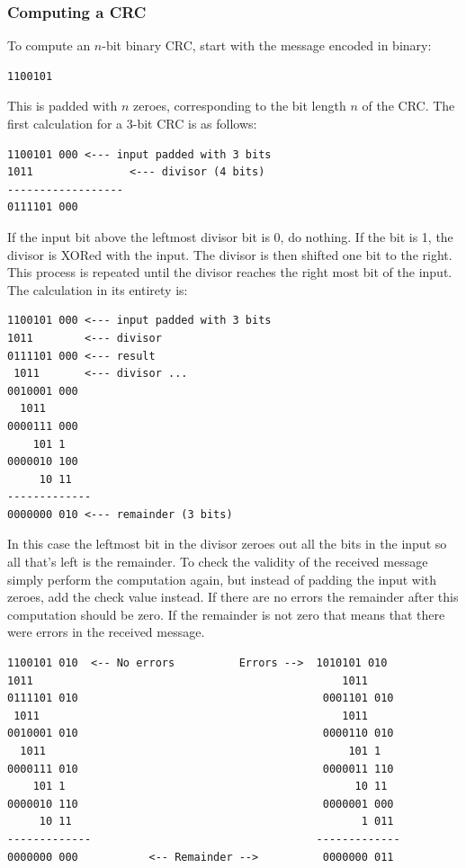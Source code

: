 \documentclass{article}
\begin{document}
\subsubsection{Computing a CRC}
To compute an $n$-bit binary CRC, start with the message encoded in binary:
\begin{verbatim}
1100101
\end{verbatim}
This is padded with $n$ zeroes, corresponding to the bit length $n$ of the CRC. The first calculation for a 3-bit CRC is as follows:
\begin{verbatim}
1100101 000 <--- input padded with 3 bits
1011               <--- divisor (4 bits) 
------------------
0111101 000
\end{verbatim}
If the input bit above the leftmost divisor bit is 0, do nothing. If the bit is 1, the divisor is XORed with the input. The divisor is then shifted one bit to the right. This process is repeated until the divisor reaches the right most bit of the input. The calculation in its entirety is:
\begin{verbatim}
1100101 000 <--- input padded with 3 bits
1011        <--- divisor
0111101 000 <--- result
 1011       <--- divisor ...
0010001 000
  1011
0000111 000
    101 1
0000010 100
     10 11
-------------     
0000000 010 <--- remainder (3 bits)                    
\end{verbatim}

In this case the leftmost bit in the divisor zeroes out all the bits in the input so all that's left is the remainder. To check the validity of the received message simply perform the computation again, but instead of padding the input with zeroes, add the check value instead. If there are no errors the remainder after this computation should be zero. If the remainder is not zero that means that there were errors in the received message.
\begin{verbatim}
1100101 010  <-- No errors          Errors -->  1010101 010
1011	                                            1011
0111101 010                                      0001101 010
 1011                                               1011 
0010001 010                                      0000110 010
  1011                                               101 1
0000111 010                                      0000011 110
    101 1                                             10 11
0000010 110                                      0000001 000
     10 11                                             1 011
-------------                                   -------------
0000000 000	          <-- Remainder -->          0000000 011
\end{verbatim}
\end{document}
